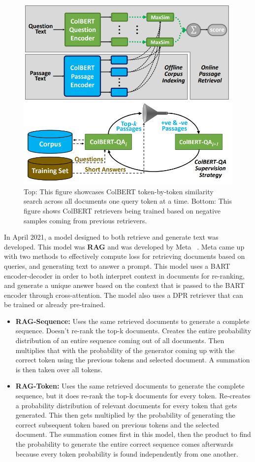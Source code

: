 \documentclass[twocolumn, 10pt]{article}
\begin{document}
\begin{figure}[H]
    \centering
    \includegraphics[width=0.5\linewidth]{ColBERT_OpenQA.png}
    \caption{Top: This figure showcases ColBERT token-by-token similarity search across all documents one query token at a time. Bottom: This figure shows ColBERT retrievers being trained based on negative samples coming from previous retrievers.}
    \label{fig:indexing-process}
\end{figure}

In April 2021, a model designed to both retrieve and generate text was developed. This model was \textbf{RAG} and was developed by Meta ~\cite{lewis2021retrieval}. Meta came up with two methods to effectively compute loss for retrieving documents based on queries, and generating text to answer a prompt. This model uses a BART encoder-decoder in order to both interpret context in documents for re-ranking,
and generate a unique answer based on the context that is passed to the BART encoder through cross-attention. The model also uses a DPR retriever that can be trained or already pre-trained.
\begin{itemize}
    \item \textbf{RAG-Sequence:} Uses the same retrieved documents to generate a complete sequence. Doesn't re-rank the top-k documents. Creates the entire probability distribution of an entire sequence coming out of all documents. Then multiplies that with the probability of the generator coming up with the correct token using the previous tokens and selected document. A summation is then taken over all tokens.
    \item \textbf{RAG-Token:} Uses the same retrieved documents to generate the complete sequence, but it does re-rank the top-k documents for every token. Re-creates a probability distribution of relevant documents for every token that gets generated. This then gets multiplied by the probability of generating the correct subsequent token based on previous tokens and the selected document. The summation comes first in this model, then the product to find the probability to generate the entire correct sequence comes afterwards because every token probability is found independently from one another.
\end{itemize}
\end{document}
